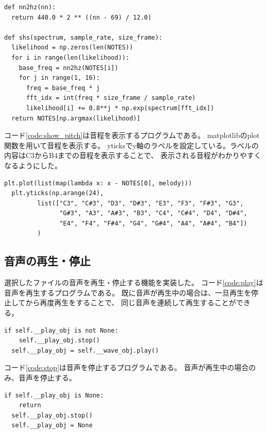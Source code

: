 \documentclass[a4paper,11pt]{jsarticle}
\begin{document}
\begin{lstlisting}[caption=音程計算,label=code:calc_pitch]
def nn2hz(nn):
  return 440.0 * 2 ** ((nn - 69) / 12.0)

def shs(spectrum, sample_rate, size_frame):
  likelihood = np.zeros(len(NOTES))
  for i in range(len(likelihood)):
    base_freq = nn2hz(NOTES[i])
    for j in range(1, 16):
      freq = base_freq * j
      fft_idx = int(freq * size_frame / sample_rate)
      likelihood[i] += 0.8**j * np.exp(spectrum[fft_idx])
  return NOTES[np.argmax(likelihood)]

\end{lstlisting}

コード\ref{code:show_pitch}は音程を表示するプログラムである。
matplotlibのplot関数を用いて音程を表示する。
yticksでy軸のラベルを設定している。ラベルの内容はC3からB4までの音程を表示することで、
表示される音程がわかりやすくなるようにした。

\begin{lstlisting}[caption=音程表示,label=code:show_pitch]
  plt.plot(list(map(lambda x: x - NOTES[0], melody)))
  plt.yticks(np.arange(24),
         list(["C3", "C#3", "D3", "D#3", "E3", "F3", "F#3", "G3",
               "G#3", "A3", "A#3", "B3", "C4", "C#4", "D4", "D#4",
               "E4", "F4", "F#4", "G4", "G#4", "A4", "A#4", "B4"])
         )
\end{lstlisting}

\subsection{音声の再生・停止}

選択したファイルの音声を再生・停止する機能を実装した。
コード\ref{code:play}は音声を再生するプログラムである。
既に音声が再生中の場合は、一旦再生を停止してから再度再生をすることで、
同じ音声を連続して再生することができる。

\begin{lstlisting}[caption=音声再生,label=code:play]
  if self.__play_obj is not None:
    self.__play_obj.stop()
  self.__play_obj = self.__wave_obj.play()
\end{lstlisting}

コード\ref{code:stop}は音声を停止するプログラムである。
音声が再生中の場合のみ、音声を停止する。

\begin{lstlisting}[caption=音声停止,label=code:stop]
  if self.__play_obj is None:
    return
  self.__play_obj.stop()
  self.__play_obj = None

\end{lstlisting}
\end{document}
